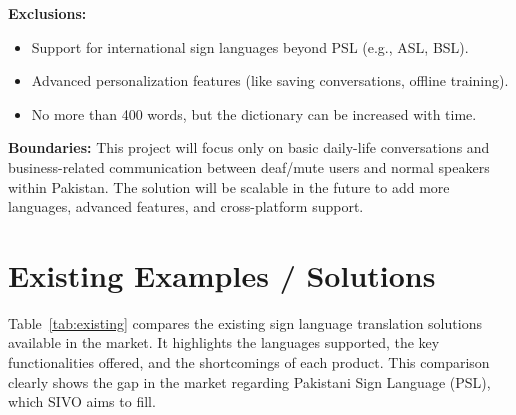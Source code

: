 \documentclass[12pt,a4paper,oneside]{report}
\begin{document}
\textbf{Exclusions:}
\begin{itemize}
  \item Support for international sign languages beyond PSL (e.g., ASL, BSL).
  \item Advanced personalization features (like saving conversations, offline training).
  \item No more than 400 words, but the dictionary can be increased with time.
\end{itemize}

\textbf{Boundaries:} This project will focus only on basic daily-life conversations and business-related communication between deaf/mute users and normal speakers within Pakistan. The solution will be scalable in the future to add more languages, advanced features, and cross-platform support.

\section{Existing Examples / Solutions}

Table~\ref{tab:existing} compares the existing sign language translation solutions available in the market. It highlights the languages supported, the key functionalities offered, and the shortcomings of each product. This comparison clearly shows the gap in the market regarding Pakistani Sign Language (PSL), which SIVO aims to fill.
\end{document}
